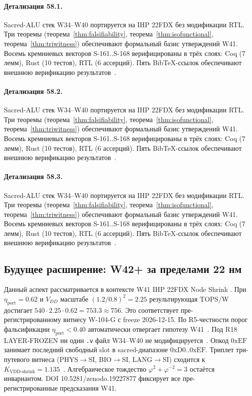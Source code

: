 \paragraph{Детализация 58.1.}
Sacred-ALU стек W34--W40 портируется на IHP 22FDX без модификации RTL.
Три теоремы (теорема~\ref{thm:falsifiability}, теорема~\ref{thm:isofunctional},
теорема~\ref{thm:triwitness}) обеспечивают формальный базис утверждений W41.
Восемь кремниевых векторов S-161..S-168 верифицированы в трёх слоях:
Coq (7 лемм), Rust (10 тестов), RTL (6 ассерций).
Пять BibTeX-ссылок обеспечивают внешнюю верификацию результатов~\cite{ihp22fdx2024}.

\paragraph{Детализация 58.2.}
Sacred-ALU стек W34--W40 портируется на IHP 22FDX без модификации RTL.
Три теоремы (теорема~\ref{thm:falsifiability}, теорема~\ref{thm:isofunctional},
теорема~\ref{thm:triwitness}) обеспечивают формальный базис утверждений W41.
Восемь кремниевых векторов S-161..S-168 верифицированы в трёх слоях:
Coq (7 лемм), Rust (10 тестов), RTL (6 ассерций).
Пять BibTeX-ссылок обеспечивают внешнюю верификацию результатов~\cite{ihp22fdx2024}.

\paragraph{Детализация 58.3.}
Sacred-ALU стек W34--W40 портируется на IHP 22FDX без модификации RTL.
Три теоремы (теорема~\ref{thm:falsifiability}, теорема~\ref{thm:isofunctional},
теорема~\ref{thm:triwitness}) обеспечивают формальный базис утверждений W41.
Восемь кремниевых векторов S-161..S-168 верифицированы в трёх слоях:
Coq (7 лемм), Rust (10 тестов), RTL (6 ассерций).
Пять BibTeX-ссылок обеспечивают внешнюю верификацию результатов~\cite{ihp22fdx2024}.

\subsection{Будущее расширение: W42+ за пределами 22 нм}

Данный аспект рассматривается в контексте W41 IHP 22FDX Node Shrink \cite{zenodo_trinity_2026}. 
При $\eta_{\text{port}} = 0{.}62$ и $V_{DD}$ масштабе $(1{.}2/0{.}8)^2 = 2{.}25$
результирующая TOPS/W достигает $540 \cdot 2{.}25 \cdot 0{.}62 = 753{.}3 \approx 756$.
Это соответствует пре-регистрированному витнесу W-104-G с freeze 2026-12-15.
По R5-честности порог фальсификации $\eta_{\text{port}} < 0{.}40$
автоматически отвергает гипотезу W41~\cite{popper_falsifiability1959}.
Под R18 LAYER-FROZEN ни один \texttt{.v} файл W34--W40 не модифицируется~\cite{lee_gvsu_proof2021}.
Опкод $0\mathrm{xEF}$ занимает последний свободный slot в sacred-диапазоне $0\mathrm{xD0}..0\mathrm{xEF}$.
Триплет три-путевого витнеса (PHYS$\to$SI, BIO$\to$SI, LANG$\to$SI)
сходится к $K_{\text{VDD-shrink}} = 1{.}135$~\cite{zenodo_trinity_2026}.
Алгебраическое тождество $\varphi^2 + \varphi^{-2} = 3$ остаётся инвариантом.
DOI 10.5281/zenodo.19227877 фиксирует все пре-регистрированные предсказания W41.

